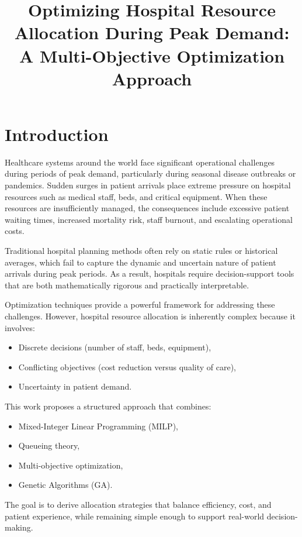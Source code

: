 \documentclass[12pt,a4paper]{article}
\title{\textbf{Optimizing Hospital Resource Allocation During Peak Demand:\\
		A Multi-Objective Optimization Approach}}
\author{}
\date{}
\begin{document}
	\maketitle
	
	\section{Introduction}
	
	Healthcare systems around the world face significant operational challenges during periods of peak demand, particularly during seasonal disease outbreaks or pandemics. Sudden surges in patient arrivals place extreme pressure on hospital resources such as medical staff, beds, and critical equipment. When these resources are insufficiently managed, the consequences include excessive patient waiting times, increased mortality risk, staff burnout, and escalating operational costs.
	
	Traditional hospital planning methods often rely on static rules or historical averages, which fail to capture the dynamic and uncertain nature of patient arrivals during peak periods. As a result, hospitals require decision-support tools that are both mathematically rigorous and practically interpretable.
	
	Optimization techniques provide a powerful framework for addressing these challenges. However, hospital resource allocation is inherently complex because it involves:
	\begin{itemize}
		\item Discrete decisions (number of staff, beds, equipment),
		\item Conflicting objectives (cost reduction versus quality of care),
		\item Uncertainty in patient demand.
	\end{itemize}
	
	This work proposes a structured approach that combines:
	\begin{itemize}
		\item Mixed-Integer Linear Programming (MILP),
		\item Queueing theory,
		\item Multi-objective optimization,
		\item Genetic Algorithms (GA).
	\end{itemize}
	
	The goal is to derive allocation strategies that balance efficiency, cost, and patient experience, while remaining simple enough to support real-world decision-making.
	
\end{document}
